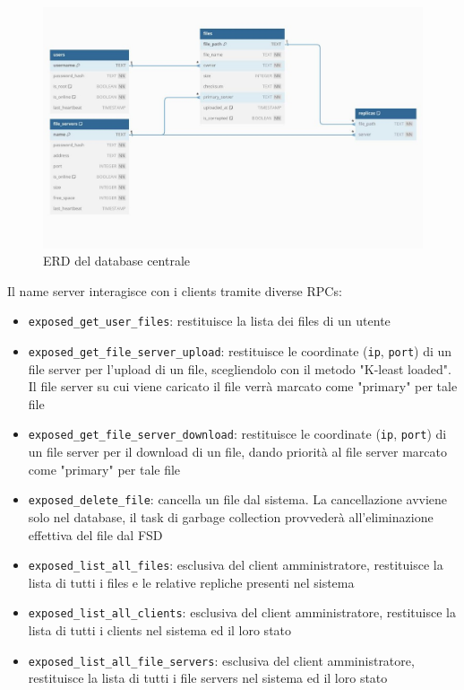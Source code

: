 \documentclass[a4paper, 12pt]{scrreprt}
\begin{document}
            \begin{figure}[H]
                \centering
                \includegraphics[width = 1. \textwidth]{img/ERD.jpg}
                \caption{ERD del database centrale}
            \end{figure}

            Il name server interagisce con i clients tramite diverse RPCs:

            \begin{itemize}

                \item \texttt{exposed\_get\_user\_files}: restituisce la lista dei files di un utente

                \item \texttt{exposed\_get\_file\_server\_upload}: restituisce le coordinate (\texttt{ip}, \texttt{port}) di un file server per l'upload di un file, scegliendolo con il metodo "K-least loaded". Il file server su cui viene caricato il file verrà marcato come "primary" per tale file

                \item \texttt{exposed\_get\_file\_server\_download}: restituisce le coordinate (\texttt{ip}, \texttt{port}) di un file server per il download di un file, dando priorità al file server marcato come "primary" per tale file

                \item \texttt{exposed\_delete\_file}: cancella un file dal sistema. La cancellazione avviene solo nel database, il task di garbage collection provvederà all'eliminazione effettiva del file dal FSD

                \item \texttt{exposed\_list\_all\_files}: esclusiva del client amministratore, restituisce la lista di tutti i files e le relative repliche presenti nel sistema

                \item \texttt{exposed\_list\_all\_clients}: esclusiva del client amministratore, restituisce la lista di tutti i clients nel sistema ed il loro stato

                \item \texttt{exposed\_list\_all\_file\_servers}: esclusiva del client amministratore, restituisce la lista di tutti i file servers nel sistema ed il loro stato

            \end{itemize}
\end{document}
